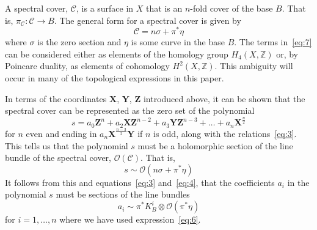 \documentclass[a4paper,12pt]{article}
\numberwithin{equation}{section}
\newcommand{\bX}{{\mathbf X}}
\newcommand{\bY}{{\mathbf Y}}
\newcommand{\bZ}{{\mathbf Z}}
\def\cC{{\mathcal C}}
\def\cO{{\mathcal O}}
\theoremstyle{plain}
\begin{document}
A spectral cover, $\cC$, is a surface in $X$ that is an $n$-fold cover of the
base $B$. That is, $\pi_{\cC}: \cC\to B$. The general form for a
spectral cover is given by
\begin{equation}
\cC=n\sigma + \pi^*\eta
\label{eq:7}
\end{equation}
where $\sigma$ is the zero section and $\eta$ is some curve in the base $B$.
The terms in~\eqref{eq:7} can be considered either as
elements of the homology group $H_{4}(X, {\mathbb Z})$ or, by
Poincare duality, as elements of cohomology $H^{2}(X, {\mathbb Z})$. 
This ambiguity
will occur in many of the topological expressions in this paper.

In terms of the coordinates $\bX$, $\bY$, $\bZ$ introduced above, 
it can be shown that
the spectral cover can be represented as the zero set of the polynomial
\begin{equation}
s=a_{0}\bZ^{n} + a_{2}\bX\bZ^{n-2} + a_{3}\bY\bZ^{n-3} + \ldots +
a_{n}\bX^{\frac{n}{2}} 
\label{eq:8}
\end{equation}
for $n$ even and ending in $a_{n}\bX^{\frac{n-3}{2}}\bY$ if $n$ is odd,
along with the relations~\eqref{eq:3}. This tells us that the polynomial
$s$ must be a holomorphic section of the line bundle of the spectral 
cover,
$\cO(\cC)$. That is,
\begin{equation}
s \sim \cO(n\sigma + \pi^{*}\eta)
\label{eq:9}
\end{equation}
It follows from this and equations~\eqref{eq:3} and~\eqref{eq:4}, that the
coefficients $a_{i}$ in the polynomial $s$ must be sections of the line
bundles
\begin{equation}
a_{i} \sim \pi^*K_{B}^{i} \otimes \cO(\pi^{*}\eta)
\label{eq:10}
\end{equation}
for $i=1,\ldots ,n$ where we have used expression~\eqref{eq:6}.
\end{document}
